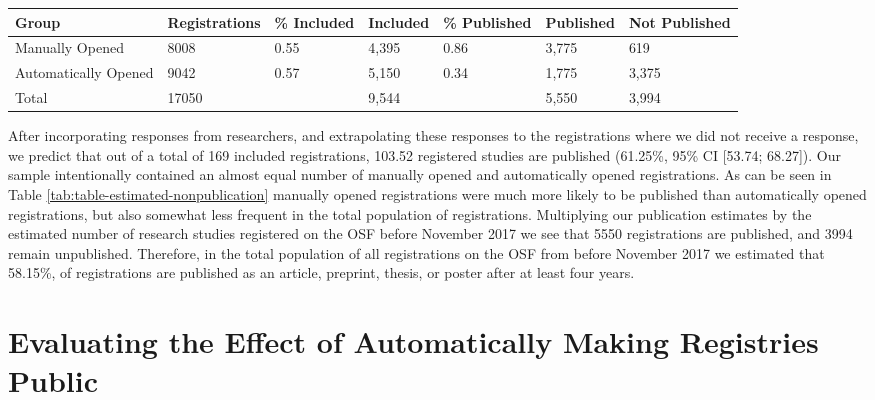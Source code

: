 \documentclass[
  ,jou, a4paper,floatsintext]{apa6}
\begin{document}
\begin{table*}[tbp]

\begin{center}
\begin{threeparttable}

\caption{\label{tab:table-estimated-nonpublication}Estimated number of published and unpublished studies registered on the OSF before November 2017.}

\begin{tabular}{lllllll}
\toprule
Group & \multicolumn{1}{c}{Registrations} & \multicolumn{1}{c}{\% Included} & \multicolumn{1}{c}{Included} & \multicolumn{1}{c}{\% Published} & \multicolumn{1}{c}{Published} & \multicolumn{1}{c}{Not Published}\\
\midrule
Manually Opened & 8008 & 0.55 & 4,395 & 0.86 & 3,775 & 619\\
Automatically Opened & 9042 & 0.57 & 5,150 & 0.34 & 1,775 & 3,375\\
Total & 17050 &  & 9,544 &  & 5,550 & 3,994\\
\bottomrule
\end{tabular}

\end{threeparttable}
\end{center}

\end{table*}

After incorporating responses from researchers, and extrapolating these responses to the registrations where we did not receive a response, we predict that out of a total of 169 included registrations, 103.52 registered studies are published (61.25\%, 95\% CI {[}53.74; 68.27{]}). Our sample intentionally contained an almost equal number of manually opened and automatically opened registrations. As can be seen in Table \ref{tab:table-estimated-nonpublication} manually opened registrations were much more likely to be published than automatically opened registrations, but also somewhat less frequent in the total population of registrations. Multiplying our publication estimates by the estimated number of research studies registered on the OSF before November 2017 we see that 5550 registrations are published, and 3994 remain unpublished. Therefore, in the total population of all registrations on the OSF from before November 2017 we estimated that 58.15\%, of registrations are published as an article, preprint, thesis, or poster after at least four years.

\hypertarget{evaluating-the-effect-of-automatically-making-registries-public}{%
\section{Evaluating the Effect of Automatically Making Registries Public}\label{evaluating-the-effect-of-automatically-making-registries-public}}
\end{document}
